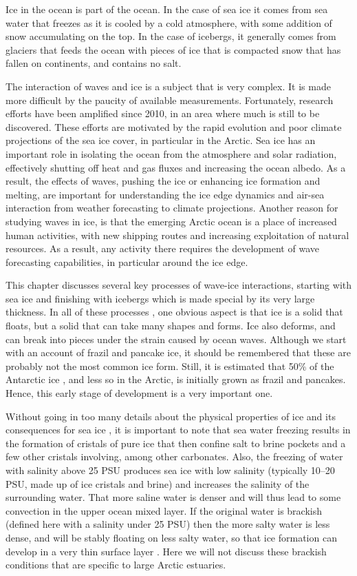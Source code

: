 Ice in the ocean is part of the ocean. In the case of sea ice it comes from sea water that freezes as it is cooled by a cold atmosphere, with some addition of snow accumulating on the top. In the case of icebergs, it generally comes from glaciers that feeds the ocean with pieces of ice that is compacted snow that has fallen on continents, and contains no salt. 

The interaction of waves and ice is a subject that is very complex. It is made more difficult by  the paucity of available measurements. Fortunately, research efforts have been amplified since 2010, in an area where much is still to be discovered. These efforts are motivated by the rapid evolution and poor climate projections of the sea ice cover, in particular in the Arctic. Sea ice has an important role in isolating the ocean from the atmosphere and solar radiation, effectively shutting off heat and gas fluxes and increasing the ocean albedo. As a result, the effects of waves, pushing the ice or enhancing  ice formation and melting, are important for understanding the ice edge dynamics and air-sea interaction from weather forecasting to climate projections. Another reason for studying waves in ice, is that the emerging Arctic ocean is a place of increased human activities, with new shipping routes and increasing exploitation of natural  resources. As a result, any activity there requires the development of wave forecasting capabilities, in particular around the ice edge. 

This chapter discusses several key processes of wave-ice interactions, starting with sea ice and finishing with icebergs which is made special by its very large thickness. 
In all of these processes , one obvious aspect is that ice is a solid that floats, but a solid that can take many shapes and forms. Ice also deforms, and can break into pieces under the strain caused by ocean waves.
Although we start with an account of frazil and pancake ice, it should be remembered that these are probably not the most common ice form. Still, it is estimated that 50\% of the Antarctic ice \citep{Gow&al.1982}, and less so in the Arctic,  is initially grown as frazil and pancakes. Hence, this early stage of development is a very important one. 

Without going in too many details about the physical properties of ice and its consequences for sea ice \citep[see][]{Weeks2010}, it is important to note that sea water freezing results in the formation of cristals of pure ice that then confine salt to brine pockets and a few other cristals involving, among other carbonates. Also, the freezing of water with salinity above 25 PSU produces sea ice with low salinity (typically 10--20 PSU, made up of ice cristals and brine) and increases the salinity of the surrounding water. That more saline water is denser and will thus lead to some convection in the upper ocean mixed layer. If the original water is brackish (defined here with a salinity under 25 PSU) then the more salty water is less dense, and will be stably floating on less salty water, so that ice formation can develop in a very thin surface layer \citep[][p. 48]{Weeks2010}. Here we will not discuss these brackish conditions that are specific to large Arctic estuaries. 

